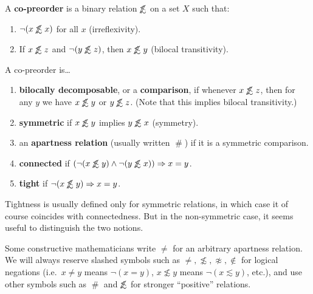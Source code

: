 \documentclass{article}
\def\apart{\mathrel{\#}}
\def\napprox{\not\approx}
\def\oapt{\mathrel{\!\not\,\not\lesssim}}
\def\leapx{\lesssim}
\let\implies\Rightarrow
\begin{document}
\begin{defn}
  A \textbf{co-preorder} is a binary relation $\oapt$ on a set $X$ such that:
  \begin{enumerate}
  \item $\neg(x\oapt x)$ for all $x$ (irreflexivity).
  \item If $x\oapt z$ and $\neg(y\oapt z)$, then $x\oapt y$ (bilocal transitivity).
  \end{enumerate}
  A co-preorder is\dots
  \begin{enumerate}[resume]
  \item \textbf{bilocally decomposable}, or a \textbf{comparison}, if whenever $x\oapt z$, then for any $y$ we have $x\oapt y$ or $y\oapt z$.
    (Note that this implies bilocal transitivity.)
  \item \textbf{symmetric} if $x\oapt y$ implies $y\oapt x$ (symmetry).
  \item an \textbf{apartness relation} (usually written $\apart$) if it is a symmetric comparison.
  \item \textbf{connected} if $(\neg(x\oapt y)\land \neg(y\oapt x))\implies x=y$.
  \item \textbf{tight} if $\neg(x\oapt y) \implies x=y$.
  \end{enumerate}
\end{defn}

Tightness is usually defined only for symmetric relations, in which case it of course coincides with connectedness.
But in the non-symmetric case, it seems useful to distinguish the two notions.

\begin{warn}
  Some constructive mathematicians write $\neq$ for an arbitrary apartness relation.
  We will always reserve slashed symbols such as $\neq,\not\leapx,\napprox,\notin$ for logical negations (i.e.\ $x\neq y$ means $\neg(x=y)$, $x\not\leapx y$ means $\neg(x\leapx y)$, etc.), and use other symbols such as $\apart$ and $\oapt$ for stronger ``positive'' relations.
\end{warn}
\end{document}
